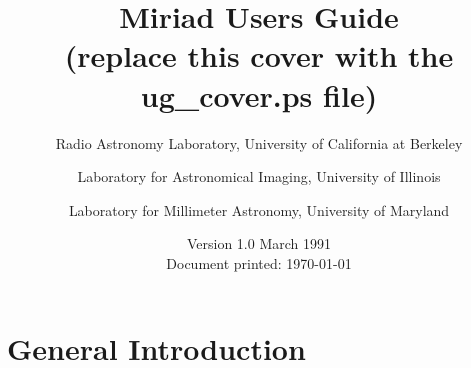 \ifdebug
 \def\mylabel#1{\index{label,#1} \label{#1}}     %
 \def\myfile#1{\index{myfile,#1}}		 %
\else
 \def\mylabel#1{\label{#1}}                     %
 \def\myfile#1{}				%
\fi



\ifdebug
 \ifindex
 \else
 \fi
\else
 \ifindex
 \else 
 \fi
\fi


\makeindex

\title{Miriad Users Guide \\
    (replace this cover with the ug\_cover.ps file)}

\author	{Radio Astronomy Laboratory, University of California at Berkeley
	\and
	 Laboratory for Astronomical Imaging, University of Illinois
	\and
	 Laboratory for Millimeter Astronomy, University of Maryland}

\date{Version 1.0  March 1991 \\
      Document printed: \today}

\setlength{\parindent}{0pt}
\setlength{\parskip}{2.5mm}
\maketitle
\newpage
\pagestyle{empty}
 
\cleardoublepage
\pagestyle{headings}
\tableofcontents
\newpage
{}
\listoftables
\cleardoublepage
{}
\part{General Introduction}
\mylabel{p:intro}
